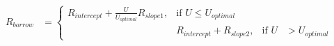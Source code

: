 \documentclass[preview]{standalone}
\begin{document}
\begin{align*}
R _{borrow} &= \begin{cases}  R _{intercept} + \frac{U}{U_{optimal}} R _{slope1}, & \text{if } U \leq U_{optimal} \\ & R _{intercept} +  R _{slope2}, & \text{if } U &> U_{optimal} \end{cases}
\end{align*}
\end{document}
